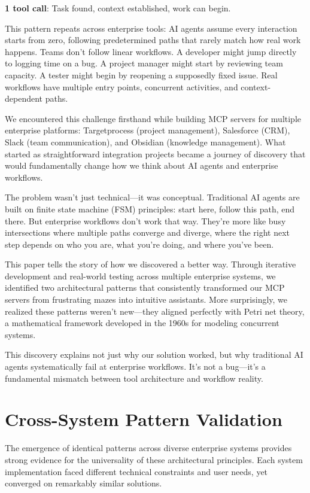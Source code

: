 \documentclass[11pt,a4paper]{article}
\begin{document}
\textbf{1 tool call}: Task found, context established, work can begin.

This pattern repeats across enterprise tools: AI agents assume every interaction starts from zero, following predetermined paths that rarely match how real work happens. Teams don't follow linear workflows. A developer might jump directly to logging time on a bug. A project manager might start by reviewing team capacity. A tester might begin by reopening a supposedly fixed issue. Real workflows have multiple entry points, concurrent activities, and context-dependent paths.

We encountered this challenge firsthand while building MCP servers for multiple enterprise platforms: Targetprocess (project management), Salesforce (CRM), Slack (team communication), and Obsidian (knowledge management). What started as straightforward integration projects became a journey of discovery that would fundamentally change how we think about AI agents and enterprise workflows.

The problem wasn't just technical—it was conceptual. Traditional AI agents are built on finite state machine (FSM) principles: start here, follow this path, end there. But enterprise workflows don't work that way. They're more like busy intersections where multiple paths converge and diverge, where the right next step depends on who you are, what you're doing, and where you've been.

This paper tells the story of how we discovered a better way. Through iterative development and real-world testing across multiple enterprise systems, we identified two architectural patterns that consistently transformed our MCP servers from frustrating mazes into intuitive assistants. More surprisingly, we realized these patterns weren't new—they aligned perfectly with Petri net theory, a mathematical framework developed in the 1960s for modeling concurrent systems.

This discovery explains not just why our solution worked, but why traditional AI agents systematically fail at enterprise workflows. It's not a bug—it's a fundamental mismatch between tool architecture and workflow reality.

\section{Cross-System Pattern Validation}

The emergence of identical patterns across diverse enterprise systems provides strong evidence for the universality of these architectural principles. Each system implementation faced different technical constraints and user needs, yet converged on remarkably similar solutions.
\end{document}
